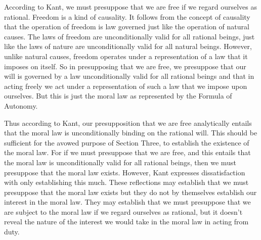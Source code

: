 According to Kant, we must presuppose that we are free if we regard ourselves as rational. Freedom is a kind of causality. It follows from the concept of causality that the operation of freedom is law governed just like the operation of natural causes. The laws of freedom are unconditionally valid for all rational beings, just like the laws of nature are unconditionally valid for all natural beings. However, unlike natural causes, freedom operates under a representation of a law that it imposes on itself. So in presupposing that we are free, we presuppose that our will is governed by a law unconditionally valid for all rational beings and that in acting freely we act under a representation of such a law that we impose upon ourselves. But this is just the moral law as represented by the Formula of Autonomy.

Thus according to Kant, our presupposition that we are free analytically entails that the moral law is unconditionally binding on the rational will. This should be sufficient for the avowed purpose of Section Three, to establish the existence of the moral law. For if we must presuppose that we are free, and this entails that the moral law is unconditionally valid for all rational beings, then we must presuppose that the moral law exists. However, Kant expresses dissatisfaction with only establishing this much. These reflections may establish that we must presuppose that the moral law exists but they do not by themselves establish our interest in the moral law. They may establish that we must presuppose that we are subject to the moral law if we regard ourselves as rational, but it doesn’t reveal the nature of the interest we would take in the moral law in acting from duty.

